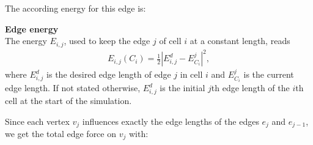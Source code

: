 The according energy for this edge is:
\begin{definition} \textbf{Edge energy} \\
	The energy $E_{i,j}$, used to keep the edge $j$ of cell $i$ at a constant length, reads 
	\begin{align}
		E_{i,j}(C_i) = \frac{1}{2} | E_{i,j}^d - E^j_{C_i}|^2, \label{eq:edgeEnergy} 
	\end{align}
	where $E_{i,j}^d$ is the desired edge length of edge $j$ in cell $i$ and $E^j_{C_i}$ is the current edge length. 
	If not stated otherwise, $E_{i,j}^d$ is the initial $j$th edge length of the $i$th cell at the start of the simulation. 
\end{definition}

Since each vertex $v_j$ influences exactly the edge lengths of the edges $e_{j}$ and $e_{j-1}$, we get the total edge force on $v_j$ with: 


